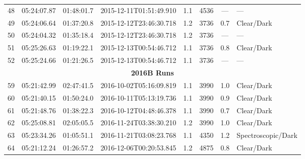 \documentclass[12pt]{article}
\begin{document}
\begin{table}
\begin{center}
\begin{threeparttable}
\begin{tabular}{lccccccl}
	48 & 05:24:07.87 & 01:48:01.7 & 2015-12-11T01:51:49.910 & 1.1  & 4536 & ---      & ---                 \\
	49 & 05:24:06.64 & 01:37:20.8 & 2015-12-12T23:46:30.718 & 1.2  & 3736 & 0.7      & Clear/Dark          \\
	50 & 05:24:04.32 & 01:35:18.4 & 2015-12-12T23:46:30.718 & 1.2  & 3736 & ---      & ---                 \\
	51 & 05:25:26.63 & 01:19:22.1 & 2015-12-13T00:54:46.712 & 1.1  & 3736 & 0.8      & Clear/Dark          \\
	52 & 05:25:24.66 & 01:21:26.5 & 2015-12-13T00:54:46.712 & 1.1  & 3736 & ---      & ---                 \\
	\multicolumn{8}{c}{{\bf 2016B Runs}} \\
	59 & 05:21:42.99 & 02:47:41.5 & 2016-10-02T05:16:09.819 & 1.1  & 3990 & 1.0      & Clear/Dark          \\
	60 & 05:21:40.15 & 01:50:24.0 & 2016-10-11T05:13:19.736 & 1.1  & 3990 & 0.9      & Clear/Dark          \\
	61 & 05:21:48.76 & 01:38:22.3 & 2016-10-12T04:48:46.378 & 1.1  & 3990 & 0.7      & Clear/Dark          \\
	62 & 05:25:08.81 & 02:05:05.5 & 2016-11-24T03:38:30.210 & 1.2  & 3990 & 1.0      & Clear/Dark          \\
	63 & 05:23:34.26 & 01:05:51.1 & 2016-11-21T03:08:23.768 & 1.1  & 4350 & 1.2      & Spectroscopic/Dark  \\
	64 & 05:21:12.24 & 01:26:57.2 & 2016-12-06T00:20:53.845 & 1.2  & 4875 & 0.8      & Clear/Dark          \\

\end{tabular}
\end{threeparttable}
\end{center}
\end{table}
\end{document}
